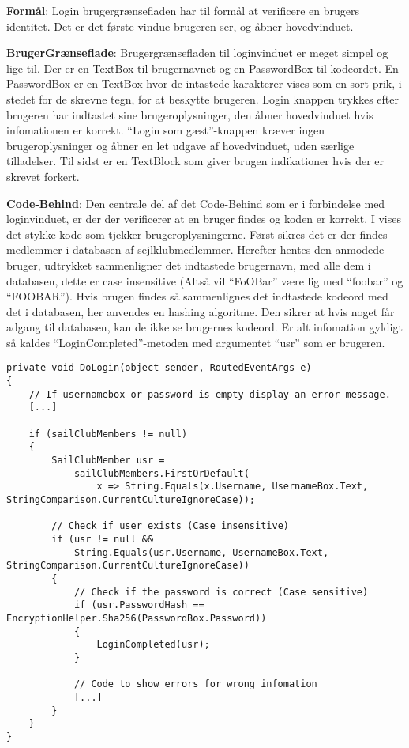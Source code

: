 \textbf{Formål}: 
Login brugergrænsefladen har til formål at verificere en brugers identitet. 
Det er det første vindue brugeren ser, og åbner hovedvinduet.

\textbf{BrugerGrænseflade}: 
Brugergrænsefladen til loginvinduet er meget simpel og lige til. 
Der er en TextBox til brugernavnet og en PasswordBox til kodeordet.
En PasswordBox er en TextBox hvor de intastede karakterer vises som en sort prik, i stedet for de skrevne tegn, for at beskytte brugeren.
Login knappen trykkes efter brugeren har indtastet sine brugeroplysninger, den åbner hovedvinduet hvis infomationen er korrekt.
``Login som gæst''-knappen kræver ingen brugeroplysninger og åbner en let udgave af hovedvinduet, uden særlige tilladelser.
Til sidst er en TextBlock som giver brugen indikationer hvis der er skrevet forkert.

\textbf{Code-Behind}: 
Den centrale del af det Code-Behind som er i forbindelse med loginvinduet, er der der verificerer at en bruger findes og koden er korrekt.
I  vises det stykke kode som tjekker brugeroplysningerne.
Først sikres det er der findes medlemmer i databasen af sejlklubmedlemmer.
Herefter hentes den anmodede bruger, udtrykket sammenligner det indtastede brugernavn, med alle dem i databasen, dette er case insensitive (Altså vil ``FoOBar'' være lig med ``foobar'' og ``FOOBAR'').
Hvis brugen findes så sammenlignes det indtastede kodeord med det i databasen, her anvendes en hashing algoritme. 
Den sikrer at hvis noget får adgang til databasen, kan de ikke se brugernes kodeord.
Er alt infomation gyldigt så kaldes ``LoginCompleted''-metoden med argumentet ``usr'' som er brugeren. 

\begin{lstlisting}[frame=single, caption=DoLogin, label=dologin]
private void DoLogin(object sender, RoutedEventArgs e)
{
    // If usernamebox or password is empty display an error message.
    [...]

    if (sailClubMembers != null)
    {
        SailClubMember usr =
            sailClubMembers.FirstOrDefault(
                x => String.Equals(x.Username, UsernameBox.Text, StringComparison.CurrentCultureIgnoreCase));

        // Check if user exists (Case insensitive)
        if (usr != null &&
            String.Equals(usr.Username, UsernameBox.Text, StringComparison.CurrentCultureIgnoreCase))
        {
            // Check if the password is correct (Case sensitive)
            if (usr.PasswordHash == EncryptionHelper.Sha256(PasswordBox.Password))
            {
                LoginCompleted(usr);
            } 

            // Code to show errors for wrong infomation
            [...]
        }
    }
}
\end{lstlisting}


